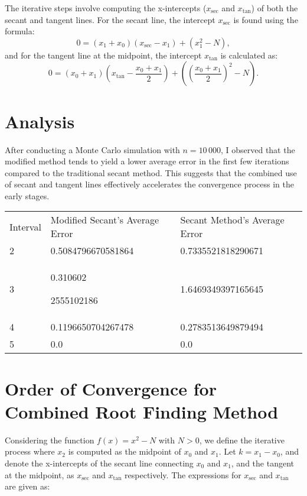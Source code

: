 \documentclass[10pt]{article}
\begin{document}
The iterative steps involve computing the x-intercepts (\(x_{\text{sec}}\) and \(x_{\text{tan}}\)) of both the secant and tangent lines. For the secant line, the intercept \(x_{\text{sec}}\) is found using the formula:
\[0 = (x_1 + x_0)(x_{\text{sec}} - x_1) + (x_1^2 - N),\]
and for the tangent line at the midpoint, the intercept \(x_{\text{tan}}\) is calculated as:
\[0 = (x_0 + x_1)\left(x_{\text{tan}} - \frac{x_0 + x_1}{2}\right) + \left(\left(\frac{x_0 + x_1}{2}\right)^2 - N\right).\]


\section*{Analysis}

After conducting a Monte Carlo simulation with \(n = 10\,000\), I observed that the modified method tends to yield a lower average error in the first few iterations compared to the traditional secant method. This suggests that the combined use of secant and tangent lines effectively accelerates the convergence process in the early stages.


\vspace{5mm}

\begin{tabular}{lll}
Interval & Modified Secant's Average Error & Secant Method's Average Error \\
2 & 0.5084796670581864 & 0.7335521818290671 \\
3 & 0.310602

2555102186 & 1.6469349397165645 \\
4 & 0.1196650704267478 & 0.2783513649879494 \\
5 & 0.0 & 0.0 \\
\end{tabular}
\vspace{5mm}

\section*{Order of Convergence for Combined Root Finding Method}

Considering the function $f(x) = x^2 - N$ with $N > 0$, we define the iterative process where $x_2$ is computed as the midpoint of $x_0$ and $x_1$. Let $k = x_1 - x_0$, and denote the x-intercepts of the secant line connecting $x_0$ and $x_1$, and the tangent at the midpoint, as $x_{\text{sec}}$ and $x_{\text{tan}}$ respectively. The expressions for $x_{\text{sec}}$ and $x_{\text{tan}}$ are given as:
\end{document}
